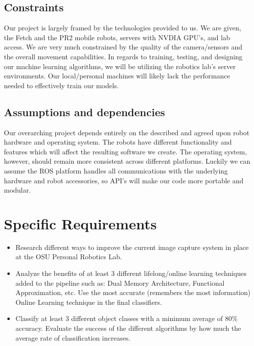 \documentclass[draftclsnofoot, onecolumn, 10pt, compsoc]{IEEEtran}
\begin{document}
\subsection{Constraints}
Our project is largely framed by the technologies provided to us. We are given, the Fetch and the PR2 mobile robots, servers with NVDIA GPU's, and lab access. We are very much constrained by the quality of the camera/sensors and the overall movement capabilities. In regards to training, testing, and designing our machine learning algorithms, we will be utilizing the robotics lab's server environments. Our local/personal machines will likely lack the performance needed to effectively train our models.   

\subsection{Assumptions and dependencies}
Our overarching project depends entirely on the described and agreed upon robot hardware and operating system. The robots have different functionality and features which will affect the resulting software we create. The operating system, however, should remain more consistent across different platforms. Luckily we can assume the ROS platform handles all communications with the underlying hardware and robot accessories, so API's will make our code more portable and modular. 

\section{Specific Requirements}
\begin{itemize}
         \item Research different ways to improve the current image capture system in place at the OSU Personal Robotics Lab. 
         \item Analyze the benefits of at least 3 different lifelong/online learning techniques added to the pipeline such as: Dual Memory Architecture, Functional Approximation, etc. Use the most accurate (remembers the most information) Online Learning technique in the final classifiers.
         \item Classify at least 3 different object classes with a minimum average of 80\% accuracy. Evaluate the success of the different algorithms by how much the average rate of classification increases. 
    \end{itemize} 	
    
\end{document}
